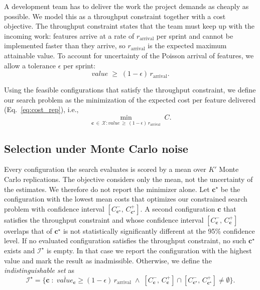 \documentclass[smallextended]{svjour3}       %
\begin{document}
A development team has to deliver the work the project demands as cheaply as possible. We model this as a throughput constraint together with a cost objective. The throughput constraint states that the team must keep up with the incoming work: features arrive at a rate of $r_\mathrm{arrival}$ per sprint and cannot be implemented faster than they arrive, so $r_\mathrm{arrival}$ is the expected maximum attainable value. To account for uncertainty of the Poisson arrival of features, we allow a tolerance $\epsilon$ per sprint:
\begin{equation}
  \mathit{value} \;\geq\; (1-\epsilon)\,r_\mathrm{arrival}.
  \label{eq:throughput_constraint}
\end{equation}

Using the feasible configurations that satisfy the throughput constraint, we define our search problem as the minimization of the expected cost per feature delivered (Eq.~\eqref{eq:cost_rep}), i.e., 
\begin{equation}
  \min_{\mathbf{c}\,\in\,\mathcal{X}: \mathit{value} \,\geq\, (1-\epsilon)\,r_\mathrm{arrival}}\; C.
  \label{eq:objective}
\end{equation}


\subsection{Selection under Monte Carlo noise}
\label{sec:model:selection}

Every configuration the search evaluates is scored by a mean over $K'$ Monte Carlo replications. The objective considers only the mean, not the uncertainty of the estimates. We therefore do not report the minimizer alone. Let $\mathbf{c}^\star$ be the configuration with the lowest mean costs that optimizes our constrained search problem with confidence interval $[C^-_{\mathbf{c}^\star},\,C^+_{\mathbf{c}^\star}]$. A second configuration $\mathbf{c}$ that satisfies the throughput constraint and whose confidence interval $[C^-_{\mathbf{c}},\,C^+_{\mathbf{c}}]$ overlaps that of $\mathbf{c}^\star$ is not statistically significantly different at the 95\% confidence level. If no evaluated configuration satisfies the throughput constraint, no such $\mathbf{c}^\star$ exists and $\mathcal{I}^\star$ is empty. In that case we report the configuration with the highest value and mark the result as inadmissible. Otherwise, we define the \emph{indistinguishable set} as
\begin{equation}
  \mathcal{I}^\star = \bigl\{\mathbf{c} \;:\; \overline{\mathit{value}}_{\mathbf{c}} \geq (1-\epsilon)\,r_\mathrm{arrival}
    \;\wedge\; [C^-_{\mathbf{c}},\,C^+_{\mathbf{c}}] \cap [C^-_{\mathbf{c}^\star},\,C^+_{\mathbf{c}^\star}] \neq \emptyset \bigr\}.
  \label{eq:topset}
\end{equation}
\end{document}
